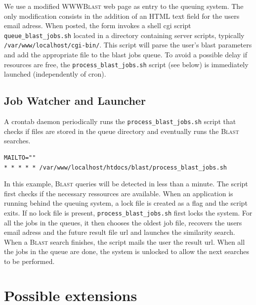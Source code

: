 \documentclass[USenglish]{scrartcl}
\newcommand{\noun}[1]{\textsc{#1}}
\begin{document}
We use a modified \noun{WWWBlast} web page as entry to the queuing system. The only modification consists in the addition of an HTML text field for the users email adress. When posted, the form invokes a shell cgi script \texttt{queue\_blast\_jobs.sh} located in a directory containing server scripts, typically \texttt{/var/www/localhost/cgi-bin/}. This script will parse the user's blast parameters and add the appropriate file to the blast jobs queue. To avoid a possible delay if resources are free, the \texttt{process\_blast\_jobs.sh} script (see below) is immediately launched (independently of cron). 


\bigskip



\subsection*{Job Watcher and Launcher}

A crontab daemon periodically runs the \texttt{process\_blast\_jobs.sh} script that checks if files are stored in the queue directory and eventually runs the \noun{Blast} searches. 
\begin{verbatim}
MAILTO=""
* * * * * /var/www/localhost/htdocs/blast/process_blast_jobs.sh 
\end{verbatim}

In this example, \noun{Blast} queries will be detected in less than a minute. The script first checks if the necessary ressources are available. When an application is running behind the queuing system, a lock file is created as a flag and the script exits. If no lock file is present, \texttt{process\_blast\_jobs.sh} first locks the system. For all the jobs in the queues, it then chooses the oldest job file, recovers the users email adress and the future result file url and launches the similarity search. When a \noun{Blast} search finishes, the script mails the user the result url. When all the jobs in the queue are done, the system is unlocked to allow the next searches to be performed.



\bigskip




\section*{Possible extensions}
\end{document}
